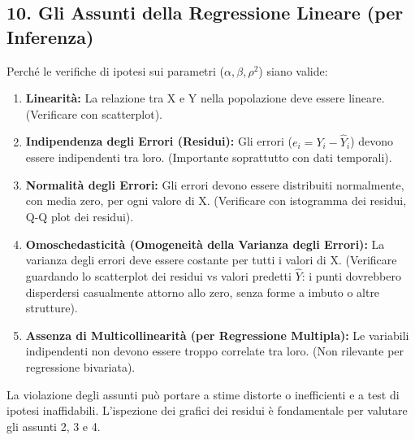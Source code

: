 \documentclass[12pt, a4paper]{article}
\newcommand{\poprho}{\rho} %
\newcommand{\Yhat}{\hat{Y}} %
\newcommand{\popbeta}{\beta} %
\newcommand{\popalpha}{\alpha} %
\newcommand{\resid}{e} %
\begin{document}
\subsection*{10. Gli Assunti della Regressione Lineare (per Inferenza)}
Perché le verifiche di ipotesi sui parametri ($\popalpha, \popbeta, \poprho^2$) siano valide:
\begin{enumerate}
    \item \textbf{Linearità:} La relazione tra X e Y nella popolazione deve essere lineare. (Verificare con scatterplot).
    \item \textbf{Indipendenza degli Errori (Residui):} Gli errori ($\resid_i = Y_i - \Yhat_i$) devono essere indipendenti tra loro. (Importante soprattutto con dati temporali).
    \item \textbf{Normalità degli Errori:} Gli errori devono essere distribuiti normalmente, con media zero, per ogni valore di X. (Verificare con istogramma dei residui, Q-Q plot dei residui).
    \item \textbf{Omoschedasticità (Omogeneità della Varianza degli Errori):} La varianza degli errori deve essere costante per tutti i valori di X. (Verificare guardando lo scatterplot dei residui vs valori predetti $\Yhat$: i punti dovrebbero disperdersi casualmente attorno allo zero, senza forme a imbuto o altre strutture).
    \item \textbf{Assenza di Multicollinearità (per Regressione Multipla):} Le variabili indipendenti non devono essere troppo correlate tra loro. (Non rilevante per regressione bivariata).
\end{enumerate}
La violazione degli assunti può portare a stime distorte o inefficienti e a test di ipotesi inaffidabili. L'ispezione dei grafici dei residui è fondamentale per valutare gli assunti 2, 3 e 4.
\end{document}
